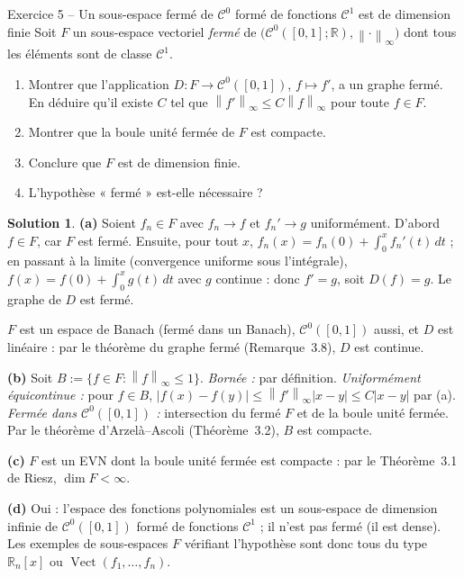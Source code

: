 \documentclass[11pt,a4paper]{article}
\newcommand{\R}{\mathbb{R}}
\newcommand{\Vect}{\operatorname{Vect}}
\newcommand{\norm}[1]{\left\|#1\right\|}
\newcommand{\Cz}{\mathcal{C}^0}
\theoremstyle{definition}
\newtheorem*{solution}{Solution}
\begin{document}
\begin{exo}{Exercice 5 -- Un sous-espace fermé de $\Cz$ formé de fonctions $\mathcal C^1$ est de dimension finie}
Soit $F$ un sous-espace vectoriel \emph{fermé} de $\big(\Cz([0,1];\R),\norm\cdot_\infty\big)$ dont tous les éléments sont de classe $\mathcal C^1$.
\begin{enumerate}[label=(\alph*)]
  \item Montrer que l'application $D:F\to\Cz([0,1])$, $f\mapsto f'$, a un graphe fermé. En déduire qu'il existe $C$ tel que $\norm{f'}_\infty\le C\norm f_\infty$ pour toute $f\in F$.
  \item Montrer que la boule unité fermée de $F$ est compacte.
  \item Conclure que $F$ est de dimension finie.
  \item L'hypothèse « fermé » est-elle nécessaire ?
\end{enumerate}
\end{exo}

\begin{solution}
\noindent\textbf{(a)} Soient $f_n\in F$ avec $f_n\to f$ et $f_n'\to g$ uniformément. D'abord $f\in F$, car $F$ est fermé. Ensuite, pour tout $x$, $f_n(x)=f_n(0)+\int_0^xf_n'(t)\,dt$ ; en passant à la limite (convergence uniforme sous l'intégrale), $f(x)=f(0)+\int_0^xg(t)\,dt$ avec $g$ continue : donc $f'=g$, soit $D(f)=g$. Le graphe de $D$ est fermé.

$F$ est un espace de Banach (fermé dans un Banach), $\Cz([0,1])$ aussi, et $D$ est linéaire : par le théorème du graphe fermé (Remarque~3.8), $D$ est continue.

\medskip
\noindent\textbf{(b)} Soit $B:=\{f\in F:\norm f_\infty\le1\}$. \emph{Bornée :} par définition. \emph{Uniformément équicontinue :} pour $f\in B$, $|f(x)-f(y)|\le\norm{f'}_\infty|x-y|\le C|x-y|$ par (a). \emph{Fermée dans $\Cz([0,1])$ :} intersection du fermé $F$ et de la boule unité fermée. Par le théorème d'Arzelà--Ascoli (Théorème~3.2), $B$ est compacte.

\medskip
\noindent\textbf{(c)} $F$ est un EVN dont la boule unité fermée est compacte : par le Théorème~3.1 de Riesz, $\dim F<\infty$.

\medskip
\noindent\textbf{(d)} Oui : l'espace des fonctions polynomiales est un sous-espace de dimension infinie de $\Cz([0,1])$ formé de fonctions $\mathcal C^1$ ; il n'est pas fermé (il est dense). Les exemples de sous-espaces $F$ vérifiant l'hypothèse sont donc tous du type $\R_n[x]$ ou $\Vect(f_1,\dots,f_n)$.
\end{solution}
\end{document}
